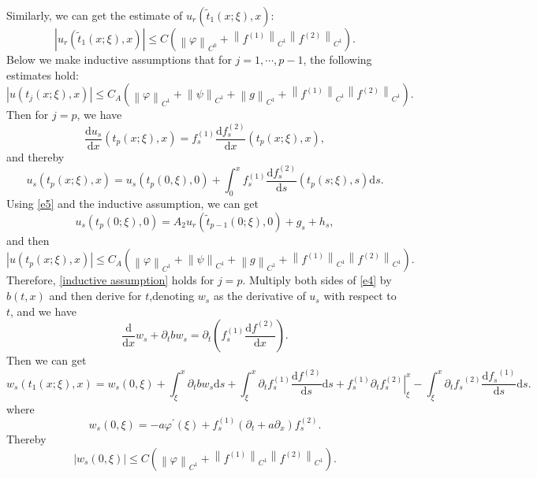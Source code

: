 \documentclass[a4paper,reqno,11pt]{amsart}
\numberwithin{equation}{section} %
\begin{document}
Similarly, we can get the estimate of $u_r\left( \tilde{t} _1(x;\xi ),x \right) $:
$$
\left| u_r\left( \tilde{t} _1(x;\xi ),x \right) \right|\leq C\left( \left\| \varphi \right\| _{C^0}+\left\| f^{(1)} \right\| _{C^1}\left\| f^{(2)} \right\| _{C^1} \right) .
$$
Below we make inductive assumptions that for $j=1,\cdots,p-1$, the following estimates hold:
\begin{equation}\label{inductive assumption}
\left| u\left( t_j(x;\xi ),x \right) \right|\leq C_A\left( \left\| \varphi \right\| _{C^1}+\left\| \psi \right\| _{C^1}+\left\| g \right\| _{C^1}+\left\| f^{(1)} \right\| _{C^1}\left\| f^{(2)} \right\| _{C^1} \right) .
\end{equation}
Then for $j=p$, we have
$$
\frac{\mathrm{d}u_s}{\mathrm{d}x}\left( t_p(x;\xi ),x \right) =f_{s}^{(1)}\frac{\mathrm{d}f_{s}^{(2)}}{\mathrm{d}x}\left( t_p(x;\xi ),x \right) ,
$$
and thereby
$$
u_s\left( t_p\left( x;\xi \right) ,x \right) =u_s(t_p(0,\xi ),0)+\int_{0}^x{f_{s}^{(1)}\frac{\mathrm{d}f_{s}^{(2)}}{\mathrm{d}s}\left( t_p\left( s;\xi \right) ,s \right) \mathrm{d}s}.
$$
Using \eqref{e5} and the inductive assumption, we can get
$$
u_s\left(t_p(0 ; \xi), 0\right)=A_2 u_r\left(\tilde{t}_{p-1}(0 ; \xi), 0\right)+g_s+h_s ,
$$
and then
$$
\left| u\left( t_p(x;\xi ),x \right) \right|\leq C_A\left( \left\| \varphi \right\| _{C^1}+\left\| \psi \right\| _{C^1}+\left\| g \right\| _{C^1}+\left\| f^{(1)} \right\| _{C^1}\left\| f^{(2)} \right\| _{C^1} \right) .
$$
Therefore, \eqref{inductive assumption} holds for $j=p$.
Multiply both sides of \eqref{e4} by $b(t,x)$ and then derive for $t$,denoting $w_s$ as the derivative of $u_s$ with respect to $t$, and we have
$$
\frac{\mathrm{d}}{\mathrm{d}x}w_s+\partial _tbw_s=\partial _t\left( f_{s}^{(1)}\frac{\mathrm{d}f^{(2)}}{\mathrm{d}x} \right). 
$$
Then we can get
\begin{equation}\label{e of w_s 1}
w_s\left( t_1(x;\xi ),x \right) =w_s(0,\xi )+\int_{\xi}^x{\partial _tbw_s\mathrm{d}s}+\int_{\xi}^x{\partial _tf_{s}^{(1)}\frac{\mathrm{d}f^{(2)}}{\mathrm{d}s}\mathrm{d}s}+\left. f_{s}^{(1)}\partial _tf_{s}^{(2)} \right|_{\xi}^{x}-\int_{\xi}^x{\partial _t{f_s}^{(2)}\frac{\mathrm{d}{f_s}^{(1)}}{\mathrm{d}s}\mathrm{d}s}.
\end{equation}
where
\begin{equation}\label{w_s at 0}
w_s(0, \xi)=-a \varphi^{\prime}(\xi)+f_s^{(1)}\left(\partial_t+a \partial_x\right) f_s^{(2)} .
\end{equation}
Thereby
$$
\left| w_s(0,\xi ) \right|\leq C\left( \left\| \varphi \right\| _{C^1}+\left\| f^{\left( 1 \right)} \right\| _{C^1}\left\| f^{(2)} \right\| _{C^1} \right) .
$$
\end{document}

